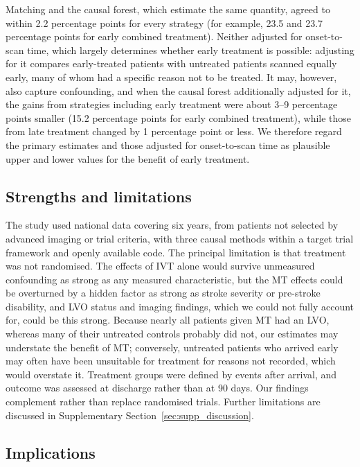 Matching and the causal forest, which estimate the same quantity, agreed to within 2.2 percentage points for every strategy (for example, 23.5 and 23.7 percentage points for early combined treatment). Neither adjusted for onset-to-scan time, which largely determines whether early treatment is possible: adjusting for it compares early-treated patients with untreated patients scanned equally early, many of whom had a specific reason not to be treated. It may, however, also capture confounding, and when the causal forest additionally adjusted for it, the gains from strategies including early treatment were about 3--9 percentage points smaller (15.2 percentage points for early combined treatment), while those from late treatment changed by 1 percentage point or less. We therefore regard the primary estimates and those adjusted for onset-to-scan time as plausible upper and lower values for the benefit of early treatment.

\subsection{Strengths and limitations}

The study used national data covering six years, from patients not selected by advanced imaging or trial criteria, with three causal methods within a target trial framework and openly available code. The principal limitation is that treatment was not randomised. The effects of IVT alone would survive unmeasured confounding as strong as any measured characteristic, but the MT effects could be overturned by a hidden factor as strong as stroke severity or pre-stroke disability, and LVO status and imaging findings, which we could not fully account for, could be this strong. Because nearly all patients given MT had an LVO, whereas many of their untreated controls probably did not, our estimates may understate the benefit of MT; conversely, untreated patients who arrived early may often have been unsuitable for treatment for reasons not recorded, which would overstate it. Treatment groups were defined by events after arrival, and outcome was assessed at discharge rather than at 90 days. Our findings complement rather than replace randomised trials. Further limitations are discussed in Supplementary Section~\ref{sec:supp_discussion}.

\subsection{Implications}

